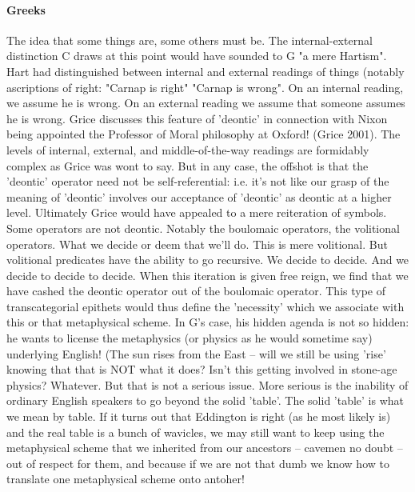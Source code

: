 \documentclass[10pt,titlepage]{book}
\begin{document}
{\paragraph{Greeks}

The idea that some things are, some others must be. The  internal-external 
distinction C draws at this point would have sounded to G "a  mere 
Hartism". Hart had distinguished between internal and external readings of  things 
(notably ascriptions of right: "Carnap is right" "Carnap is wrong". On an  
internal reading, we assume he is wrong. On an external reading we assume 
that  someone assumes he is wrong. Grice discusses this feature of 'deontic' 
in  connection with Nixon being appointed the Professor of Moral philosophy 
at  Oxford! (Grice 2001). The levels of internal, external, and 
middle-of-the-way  readings are formidably complex as Grice was wont to say. But in any 
case, the  offshot is that the 'deontic' operator need not be 
self-referential: i.e. it's  not like our grasp of the meaning of 'deontic' involves our 
acceptance of  'deontic' as deontic at a higher level. Ultimately Grice would 
have appealed to  a mere reiteration of symbols. Some operators are not 
deontic. Notably the  boulomaic operators, the volitional operators. What we 
decide or deem that  we'll do. This is mere volitional. But volitional 
predicates have the ability to  go recursive. We decide to decide. And we decide 
to decide to decide. When this  iteration is given free reign, we find that 
we have cashed the deontic operator  out of the boulomaic operator. This type 
of transcategorial epithets would  thus define the 'necessity' which we 
associate with this or that metaphysical  scheme. In G's case, his hidden 
agenda is not so hidden: he wants to license the  metaphysics (or physics as he 
would sometime say) underlying English! (The sun  rises from the East -- will 
we still be using 'rise' knowing that that is NOT  what it does? Isn't this 
getting involved in stone-age physics? Whatever. But  that is not a serious 
issue. More serious is the inability of ordinary English  speakers to go 
beyond the solid 'table'. The solid 'table' is what we mean by  table. If it 
turns out that Eddington is right (as he most likely is) and the  real table 
is a bunch of wavicles, we may still want to keep using the  metaphysical 
scheme that we inherited from our ancestors -- cavemen no doubt --  out of 
respect for them, and because if we are not that dumb we know how to  
translate one metaphysical scheme onto antoher!
 
}
\end{document}
